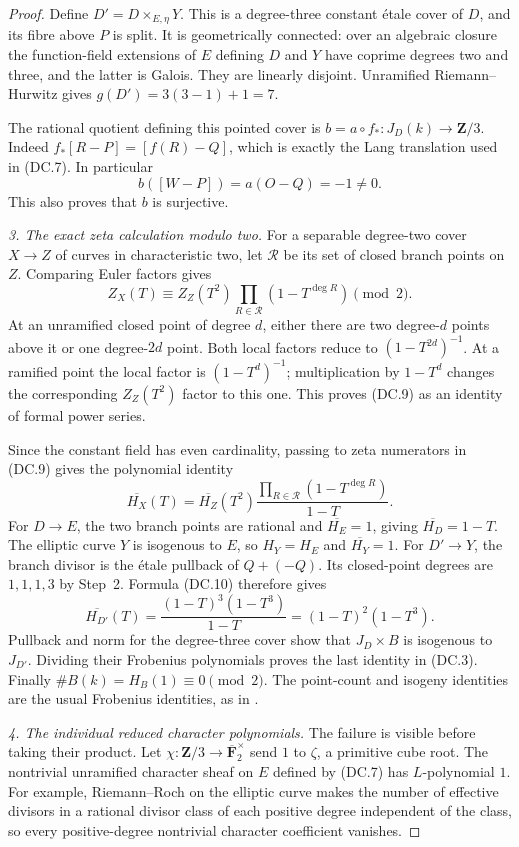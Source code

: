 \begin{proof}
Define $D'=D\times_{E,\eta}Y$.  This is a degree-three
constant \'etale cover of $D$, and its fibre above $P$ is
split.  It is geometrically connected: over an algebraic
closure the function-field extensions of $E$ defining $D$
and $Y$ have coprime degrees two and three, and the latter
is Galois.  They are linearly disjoint.
Unramified Riemann--Hurwitz gives $g(D')=3(3-1)+1=7$.

The rational quotient defining this pointed cover is
$b=a\circ f_*:J_D(k)\to\mathbf Z/3$.
Indeed $f_*[R-P]=[f(R)-Q]$, which is exactly the Lang
translation used in (DC.7).  In particular
\[
                 b([W-P])=a(O-Q)=-1\ne0.
\tag{DC.8}
\]
This also proves that $b$ is surjective.

\emph{3. The exact zeta calculation modulo two.}
For a separable degree-two cover $X\to Z$ of curves in
characteristic two, let $\mathcal R$ be its set of closed
branch points on $Z$.  Comparing Euler factors gives
\[
 Z_X(T)\equiv Z_Z(T^2)
                   \prod_{R\in\mathcal R}(1-T^{\deg R})
                                \pmod2.
\tag{DC.9}
\]
At an unramified closed point of degree $d$, either there
are two degree-$d$ points above it or one degree-$2d$ point.
Both local factors reduce to $(1-T^{2d})^{-1}$.
At a ramified point the local factor is $(1-T^d)^{-1}$;
multiplication by $1-T^d$ changes the corresponding
$Z_Z(T^2)$ factor to this one.  This proves (DC.9) as an
identity of formal power series.

Since the constant field has even cardinality, passing to
zeta numerators in (DC.9) gives the polynomial identity
\[
 \overline{H_X}(T)=\overline{H_Z}(T^2)
             \frac{\prod_{R\in\mathcal R}(1-T^{\deg R})}{1-T}.
\tag{DC.10}
\]
For $D\to E$, the two branch points are rational and
$\overline{H_E}=1$, giving $\overline{H_D}=1-T$.
The elliptic curve $Y$ is isogenous to $E$, so
$H_Y=H_E$ and $\overline{H_Y}=1$.
For $D'\to Y$, the branch divisor is the \'etale pullback
of $Q+(-Q)$.  Its closed-point degrees are $1,1,1,3$ by
Step~2.  Formula (DC.10) therefore gives
\[
       \overline{H_{D'}}(T)
              =\frac{(1-T)^3(1-T^3)}{1-T}
              =(1-T)^2(1-T^3).
\]
Pullback and norm for the degree-three cover show that
$J_D\times B$ is isogenous to $J_{D'}$.  Dividing their
Frobenius polynomials proves the last identity in (DC.3).
Finally
$\#B(k)=H_B(1)\equiv0\pmod2$.
The point-count and isogeny identities are the usual
Frobenius identities, as in
\cite[Theorem~19.1(b) and its Frobenius proof, pp.~40--41]{MilneAV}.

\emph{4. The individual reduced character polynomials.}
The failure is visible before taking their product.
Let $\chi:\mathbf Z/3\to\overline{\mathbf F}_2^\times$
send $1$ to $\zeta$, a primitive cube root.
The nontrivial unramified character sheaf on $E$ defined
by (DC.7) has $L$-polynomial $1$.
For example, Riemann--Roch on the elliptic curve makes
the number of effective divisors in a rational divisor
class of each positive degree independent of the class,
so every positive-degree nontrivial character coefficient
vanishes.


\end{proof}
